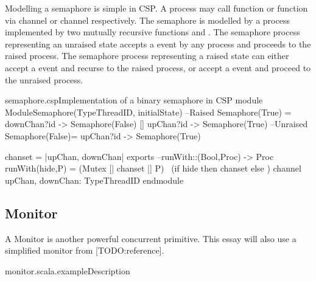 \documentclass{article}
\begin{document}
Modelling a semaphore is simple in CSP. A process may call  function or  function via channel  or channel  respectively. The semaphore is modelled by a process implemented by two mutually recursive functions  and . The semaphore process representing an unraised state accepts a  event by any process and proceeds to the raised process. The semaphore process representing a raised state can either accept a  event and recurse to the raised process, or accept a  event and proceed to the unraised process.

\begin{cspinline}{semaphore.csp}{Implementation of a binary semaphore in CSP}
module ModuleSemaphore(TypeThreadID, initialState)
  --Raised
  Semaphore(True) = downChan?id -> Semaphore(False)
                   [] upChan?id -> Semaphore(True)
  --Unraised
  Semaphore(False)= upChan?id   -> Semaphore(True)
  
  chanset = {|upChan, downChan|}
exports
  --runWith::(Bool,Proc) -> Proc
  runWith(hide,P) = (Mutex [| chanset |] P) \ 
                     (if hide then chanset else {})
  channel upChan, downChan: TypeThreadID
endmodule
\end{cspinline}

\subsection{Monitor}
A Monitor is another powerful concurrent primitive. This essay will also use a simplified monitor from [TODO:reference].

\begin{scalainline}{monitor.scala.example}{Description}
\end{scalainline}
\end{document}
